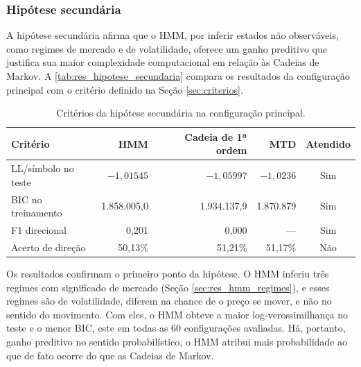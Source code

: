 \documentclass[
    12pt,                %
    openright,           %
    oneside,             %
    a4paper,             %
    english,             %
    brazil               %
]{abntex2}
\begin{document}

\subsubsection{Hipótese secundária}
\label{sec:res_hipotese_secundaria}

A hipótese secundária afirma que o HMM, por inferir estados não observáveis, como regimes de mercado e de volatilidade, oferece um ganho 
preditivo que justifica sua maior complexidade computacional em relação às Cadeias de Markov. A \autoref{tab:res_hipotese_secundaria} compara os 
resultados da configuração principal com o critério definido na Seção \ref{sec:criterios}.

\begin{table}[htbp]
    \centering
    \caption{Critérios da hipótese secundária na configuração principal.}
    \label{tab:res_hipotese_secundaria}
    \small
    \begin{tabular}{@{}>{\raggedright\arraybackslash}p{}rrrc@{}}
        \toprule
        \textbf{Critério} & \textbf{HMM} & \textbf{Cadeia de 1ª ordem} & \textbf{MTD} & \textbf{Atendido} \\
        \midrule
        LL/símbolo no teste & $-1{,}01545$ & $-1{,}05997$ & $-1{,}0236$ & Sim \\
        BIC no treinamento & 1.858.005,0 & 1.934.137,9 & 1.870.879 & Sim \\
        F1 direcional & 0,201 & 0,000 & --- & Sim \\
        Acerto de direção & 50,13\% & 51,21\% & 51,17\% & Não \\
        \bottomrule
    \end{tabular}
\end{table}

Os resultados confirmam o primeiro ponto da hipótese. O HMM inferiu três regimes com significado de mercado (Seção \ref{sec:res_hmm_regimes}), e esses regimes são de volatilidade, 
diferem na chance de o preço se mover, e não no sentido do movimento. Com eles, o HMM obteve a maior log-verossimilhança no teste e o menor BIC, este em todas as 
60 configurações avaliadas. Há, portanto, ganho preditivo no sentido probabilístico, o HMM atribui mais probabilidade ao que de fato ocorre do que as Cadeias de Markov.
\end{document}
